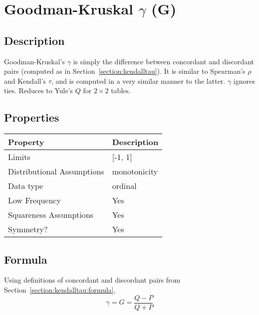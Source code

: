 \documentclass[11pt]{article}
\begin{document}
\section{Goodman-Kruskal $\gamma$ (G)} %
\subsection{Description}
Goodman-Kruskal's $\gamma$ is simply the difference between concordant and discordant pairs (computed as in Section~\ref{section:kendalltau}).  It is similar to Spearman's $\rho$ and Kendall's $\tau$, and is computed in a very similar manner to the latter.  $\gamma$ ignores ties.  Reduces to Yule's $Q$ for $2 \times 2$ tables.

\subsection{Properties}
\begin{tabular}{| l || l |}
    \hline
    {\bf Property} & {\bf Description} \\
    \hline
    Limits & [-1, 1] \\ \hline

    Distributional Assumptions& monotonicity \\ \hline

    Data type & ordinal \\ \hline

    Low Frequency & Yes \\ \hline

    Squareness Assumptions & Yes \\ \hline
    
    Symmetry? & Yes \\ \hline

\end{tabular}


\subsection{Formula}
Using definitions of concordant and discordant pairs from Section~\ref{section:kendalltau:formula},
$$
\gamma = G = \frac{Q-P}{Q+P}
$$
\end{document}

